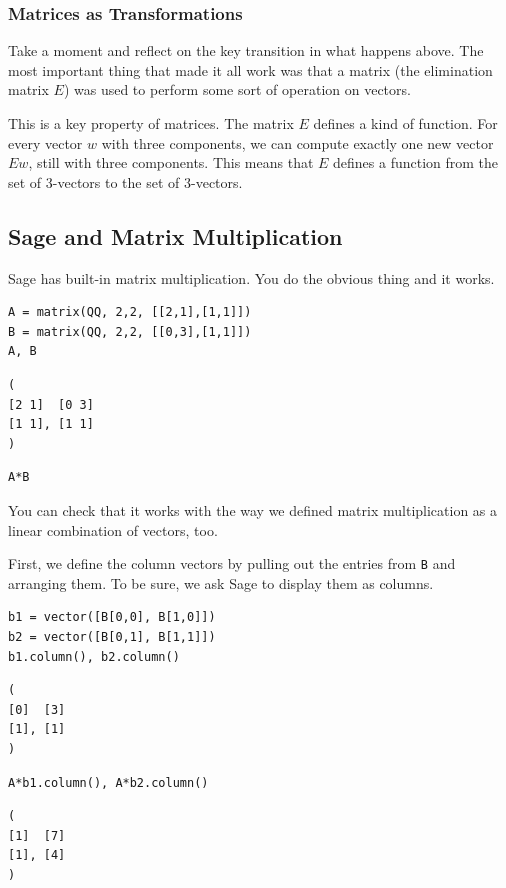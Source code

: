 \documentclass[10pt,]{book}
\theoremstyle{plain}
\numberwithin{equation}{section}
\begin{document}
\subsubsection[Matrices as Transformations]{Matrices as Transformations}\label{subsubsection-16}

        Take a moment and reflect on the key transition in what happens above.
        The most important thing that made it all work was that a matrix (the
        elimination matrix \(E\)) was used to perform some sort of operation on
        vectors.
\par

        This is a key property of matrices. The matrix \(E\) defines a kind of
        function. For every vector \(w\) with three components, we can compute
        exactly one new vector \(Ew\), still with three components. This means that
        \(E\) defines a function from the set of \(3\)-vectors to the set of
        \(3\)-vectors.
\typeout{************************************************}
\typeout{************************************************}
\subsection[Sage and Matrix Multiplication]{Sage and Matrix Multiplication}\label{subsection-32}

      Sage has built-in matrix multiplication. You do the obvious thing and it
      works.
\begin{lstlisting}[style=sageinput]
A = matrix(QQ, 2,2, [[2,1],[1,1]])
B = matrix(QQ, 2,2, [[0,3],[1,1]])
A, B
\end{lstlisting}
\begin{lstlisting}[style=sageoutput]
(
[2 1]  [0 3]
[1 1], [1 1]
)
\end{lstlisting}
\begin{lstlisting}[style=sageinput]
A*B
\end{lstlisting}
\par

      You can check that it works with the way we defined matrix multiplication
      as a linear combination of vectors, too.
\par

      First, we define the column vectors by pulling out the entries from \verb?B?
      and arranging them. To be sure, we ask Sage to display them as columns.
\begin{lstlisting}[style=sageinput]
b1 = vector([B[0,0], B[1,0]])
b2 = vector([B[0,1], B[1,1]])
b1.column(), b2.column()
\end{lstlisting}
\begin{lstlisting}[style=sageoutput]
(
[0]  [3]
[1], [1]
)
\end{lstlisting}
\begin{lstlisting}[style=sageinput]
A*b1.column(), A*b2.column()
\end{lstlisting}
\begin{lstlisting}[style=sageoutput]
(
[1]  [7]
[1], [4]
)
\end{lstlisting}
\par
\end{document}
